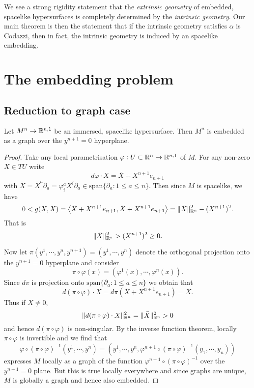 \documentclass[a4paper, 12pt]{amsart}
\begin{document}
\begin{rem}
We see a strong rigidity statement that the \emph{extrinsic geometry} of embedded, spacelike hypersurfaces is completely determined by the \emph{intrinsic geometry}. Our main theorem is then the statement that if the intrinsic geometry satisfies \(\alpha\) is Codazzi, then in fact, the intrinsic geometry is induced by an spacelike embedding.
\end{rem}

\section{The embedding problem}
\label{sec:embedding}

\subsection{Reduction to graph case}
\label{subsec:embedding_graph}

\begin{lemma}
Let \(M^n \to \mathbb{R}^{n,1}\) be an immersed, spacelike hypersurface. Then \(M^n\) is embedded as a graph over the \(y^{n+1} = 0\) hyperplane.
\end{lemma}

\begin{proof}
Take any local parametrisation \(\varphi : U \subset \mathbb{R}^n \to \mathbb{R}^{n,1}\) of \(M\). For any non-zero \(X \in TU\) write
\[
d\varphi \cdot X = \bar{X} + X^{n+1} e_{n+1}
\]
with \(\bar{X} = \bar{X}^a \partial_a = \varphi^a_i X^i \partial_a \in \text{span} \{\partial_a : 1 \leq a \leq n\}\). Then since \(M\) is spacelike, we have
\[
0 < g(X, X) = \left\langle \bar{X} + X^{n+1} e_{n+1},\bar{X} + X^{n+1} e_{n+1} \right\rangle = \|\bar{X}\|_{\mathbb{R}^n}^2 - (X^{n+1})^2.
\]
That is
\[
\|\bar{X}\|_{\mathbb{R}^n}^2 > (X^{n+1})^2 \geq 0.
\]

Now let \(\pi(y^1, \cdots, y^n, y^{n+1}) = (y^1, \cdots, y^n)\) denote the orthogonal projection onto the \(y^{n+1} = 0\) hyperplane and consider
\[
\pi \circ \varphi (x) = (\varphi^1(x), \cdots, \varphi^n(x)).
\]
Since \(d \pi\) is projection onto \(\text{span} \{\partial_a : 1 \leq a \leq n\}\) we obtain that
\[
d(\pi \circ \varphi) \cdot X = d\pi (\bar{X} + X^{n+1} e_{n+1}) = \bar{X}.
\]
Thus if \(X \ne 0\),
\[
\|d(\pi \circ \varphi) \cdot X\|_{\mathbb{R}^n}^2 = \|\bar{X}\|_{\mathbb{R}^n}^2 > 0
\]
and hence \(d(\pi \circ \varphi)\) is non-singular. By the inverse function theorem, locally \(\pi \circ \varphi\) is invertible and we find that
\[
\varphi \circ (\pi \circ \varphi)^{-1} (y^1, \cdots, y^n) = (y^1, \cdots, y^n, \varphi^{n+1} \circ (\pi \circ \varphi)^{-1} (y_1, \cdots, y_n))
\]
expresses \(M\) locally as a graph of the function \(\varphi^{n+1} \circ (\pi \circ \varphi)^{-1}\) over the \(y^{n+1} = 0\) plane. But this is true locally everywhere and since graphs are unique, \(M\) is globally a graph and hence also embedded.
\end{proof}
\end{document}
